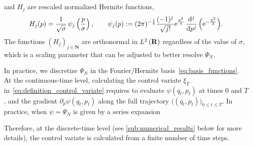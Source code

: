 \documentclass[11pt,a4paper]{article}
\newcommand{\e}{\mathrm{e}}
\newcommand{\nat}{\mathbf N}
\newcommand{\real}{\mathbf R}
\theoremstyle{plain}
\numberwithin{equation}{section}
\renewcommand{\leq}{\leqslant}
\begin{document}
and $H_j$ are rescaled normalized Hermite functions,
\begin{equation}
  \label{eq:definition_hermite_functions}
  H_j(p) = \frac{1}{\sqrt{\sigma}} \, \psi_j \left( \frac{p}{\sigma} \right),
  \qquad \psi_j (p) := (2 \pi)^{-\frac{1}{4}} \frac{(-1)^j}{\sqrt{j!}} \e^{\frac{p^2}{4}} \, \derivative*{j}{p^j} \, \Bigl( \e^{- \frac{p^2}{2}} \Bigr).
\end{equation}
The functions $(H_j)_{j\in \nat}$ are orthonormal in $\lp{2}{\real}$ regardless of the value of $\sigma$,
which is a scaling parameter that can be adjusted to better resolve $\Psi_N$.

In practice,
we discretize $\Psi_N$ in the Fourier/Hermite basis~\eqref{eq:basis_functions}.
At the continuous-time level,
calculating the control variate $\xi_T$ in~\eqref{eq:definition_control_variate} requires to evaluate $\psi(q_t, p_t)$
at times 0 and $T$,
and the gradient $\partial_p \psi( q_t,  p_t)$ along the full trajectory $\bigl(( q_t,  p_t)\bigr)_{0\leq t\leq T}$.
In practice, when $\psi = \Psi_N$ is given by a series expansion

Therefore, at the discrete-time level (see \cref{sub:numerical_results} below for more details),
the control variate is calculated from a finite number of time steps.
\end{document}
